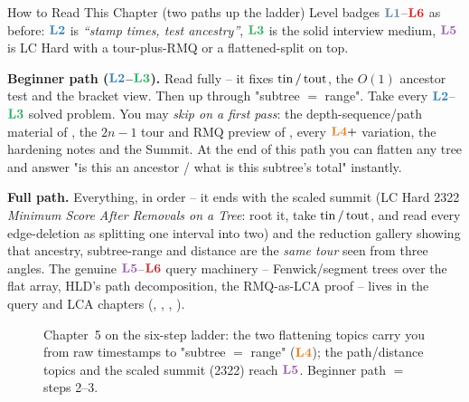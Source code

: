 \begin{chaptertheorybox}{How to Read This Chapter (two paths up the ladder)}
Level badges $\lv1$--$\lv6$ as before: $\lv2$ is \emph{``stamp times, test ancestry''},
$\lv3$ is the solid interview medium, $\lv5$ is LC Hard with a tour-plus-RMQ or a
flattened-split on top.

\textbf{Beginner path ($\lv2$--$\lv3$).} Read  fully -- it fixes
$\operatorname{tin}/\operatorname{tout}$, the $O(1)$ ancestor test and the bracket view. Then  up
through "subtree $=$ range". Take every $\lv2$--$\lv3$ solved problem. You may \emph{skip
on a first pass}: the depth-sequence/path material of , the $2n{-}1$ tour
and RMQ preview of , every $\lv4{+}$ variation, the hardening notes and the
Summit. At the end of this path you can flatten any tree and answer "is this an ancestor /
what is this subtree's total" instantly.

\textbf{Full path.} Everything, in order -- it ends with the scaled summit (LC Hard 2322
\emph{Minimum Score After Removals on a Tree}: root it, take $\operatorname{tin}/\operatorname{tout}$, and read every
edge-deletion as splitting one interval into two) and the reduction gallery showing that
ancestry, subtree-range and distance are the \emph{same tour} seen from three angles. The
genuine $\lv5$--$\lv6$ query machinery -- Fenwick/segment trees over the flat array, HLD's
path decomposition, the RMQ-as-LCA proof -- lives in the query and LCA chapters
(, , , ).
\end{chaptertheorybox}

\begin{figure}[H]
\centering
{}
\caption*{Chapter~5 on the six-step ladder: the two flattening topics carry you from raw
timestamps to "subtree $=$ range" ($\lv4$); the path/distance topics and the scaled summit
(2322) reach $\lv5$. Beginner path $=$ steps 2--3.}
\end{figure}

